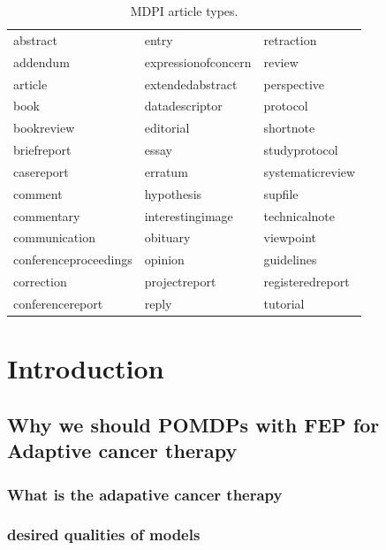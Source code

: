 \documentclass[notspecified,article,submit,moreauthors,pdftex]{Definitions/mdpi}
\begin{document}

\begin{table}

\caption{\label{tab:mdpitype}MDPI article types.}
\centering
\begin{tabular}[t]{lll}
\toprule
abstract & entry & retraction\\
addendum & expressionofconcern & review\\
article & extendedabstract & perspective\\
book & datadescriptor & protocol\\
bookreview & editorial & shortnote\\
\addlinespace
briefreport & essay & studyprotocol\\
casereport & erratum & systematicreview\\
comment & hypothesis & supfile\\
commentary & interestingimage & technicalnote\\
communication & obituary & viewpoint\\
\addlinespace
conferenceproceedings & opinion & guidelines\\
correction & projectreport & registeredreport\\
conferencereport & reply & tutorial\\
\bottomrule
\end{tabular}
\end{table}

\section{Introduction}\label{introduction}

\subsection{Why we should POMDPs with FEP for Adaptive cancer
therapy}\label{why-we-should-pomdps-with-fep-for-adaptive-cancer-therapy}

\subsubsection{What is the adapative cancer
therapy}\label{what-is-the-adapative-cancer-therapy}

\subsubsection{desired qualities of
models}\label{desired-qualities-of-models}
\end{document}
